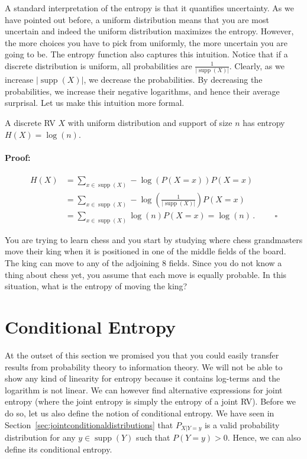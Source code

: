 \documentclass[11pt,leqno,a4paper]{report}\usepackage[]{graphicx}\usepackage[]{color}
\newcommand{\supp}{\operatorname{supp}}
\begin{document}
A standard interpretation of the entropy is that it quantifies uncertainty. As we have pointed out before, a uniform distribution means that you are most uncertain and indeed the uniform distribution maximizes the entropy. However, the more choices you have to pick from uniformly, the more uncertain you are going to be.  The entropy function also captures this intuition. Notice that if a discrete distribution is uniform, all probabilities are $ \frac{1}{|\supp(X)|} $. Clearly, as we increase $ |\supp(X)| $, we decrease the probabilities. By decreasing the probabilities, we increase their negative logarithms, and hence their average surprisal. Let us make this intuition more formal.

\begin{Theorem}
A discrete RV $ X $ with uniform distribution and support of size $ n $ has entropy
$ H(X) = \log(n) $.
\end{Theorem}

\paragraph{Proof:}
\begin{align}
H(X) &= \underset{x \in \supp(X)}{\sum}-\log(P(X=x))P(X=x) \\
&= \underset{x \in \supp(X)}{\sum} -\log(\frac{1}{|\supp(X)|})P(X=x) \\
&= \underset{x \in \supp(X)}{\sum}\log(n)P(X=x) = \log(n) \, .
\hspace{1cm} \square
\end{align}

\begin{Exercise}
You are trying to learn chess and you start by studying where chess grandmasters move their king when it
is positioned in one of the middle fields of the board. The king can move to any of the adjoining 8 fields. Since
you do not know a thing about chess yet, you assume that each move is equally probable. In this situation,
what is the entropy of moving the king?
\end{Exercise}

\section{Conditional Entropy}
At the outset of this section we promised you that you could easily transfer results from probability 
theory to information theory. We will not be able to show any kind of linearity for entropy because it contains
log-terms and the logarithm is not linear. We can however find alternative expressions for joint entropy (where 
the joint entropy is simply the entropy of a joint RV). Before we do so, let us also define the notion of 
conditional entropy. We have seen in Section~\ref{sec:jointconditionaldistributions} that $P_{X|Y=y}$ is a valid probability distribution for any $y \in \supp(Y)$ such that $P(Y=y)>0$. Hence, we can also define its conditional entropy.
\end{document}
